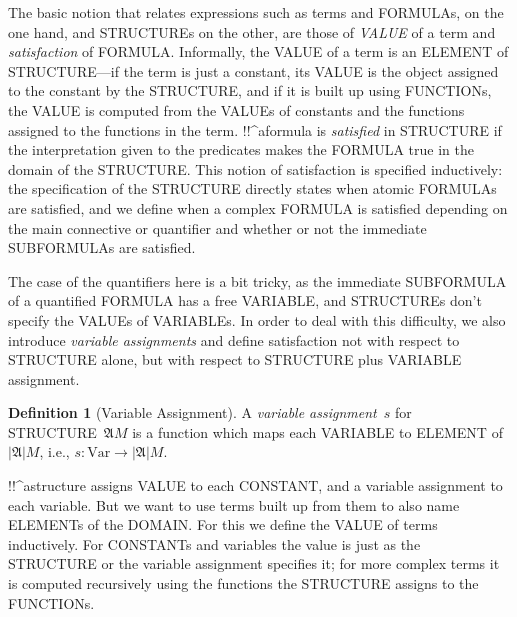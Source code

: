 \documentclass[10pt,a4paper]{article}
\newcommand*{\olup}[1]{\MakeUppercase{#1}}
\theoremstyle{plain}
\theoremstyle{definition}
\newtheorem{defn}[thm]{Definition}
\theoremstyle{remark}
\newenvironment{explain}{}{}
\providecommand{\Struct}{\ensuremath{\mathfrak{A}}}
\providecommand{\Domain}{\ensuremath{|\mathfrak{A}|}}
\providecommand{\Var}{\mathrm{Var}}
\begin{document}
\begin{explain}
The basic notion that relates expressions such as terms and
\olup{formula}s, on the one hand, and \olup{structure}s on the other, are
those of \emph{\olup{value}} of a term and \emph{satisfaction} of 
\olup{formula}.  Informally, the \olup{value} of a term is an \olup{element} of
\olup{structure}---if the term is just a constant, its \olup{value} is the
object assigned to the constant by the \olup{structure}, and if it is
built up using \olup{function}s, the \olup{value} is computed from the
\olup{value}s of constants and the functions assigned to the functions in
the term.  !!^a{formula} is \emph{satisfied} in \olup{structure} if the
interpretation given to the predicates makes the \olup{formula} true in
the domain of the \olup{structure}. This notion of satisfaction is
specified inductively: the specification of the \olup{structure} directly
states when atomic \olup{formula}s are satisfied, and we define when a
complex \olup{formula} is satisfied depending on the main connective or
quantifier and whether or not the immediate \olup{subformula}s are
satisfied. 

The case of the quantifiers here is a bit tricky, as the
immediate \olup{subformula} of a quantified \olup{formula} has a free
\olup{variable}, and \olup{structure}s don't specify the \olup{value}s of
\olup{variable}s.  In order to deal with this difficulty, we also
introduce \emph{variable assignments} and define satisfaction not with
respect to \olup{structure} alone, but with respect to \olup{structure}
plus \olup{variable} assignment.
\end{explain}

\begin{defn}[Variable Assignment]
A \emph{variable assignment}~$s$ for \olup{structure}~$\Struct{M}$ is a
function which maps each \olup{variable} to \olup{element} of~$\Domain M$,
i.e., $s\colon \Var \to \Domain M$.
\end{defn}

\begin{explain}
!!^a{structure} assigns \olup{value} to each \olup{constant}, and a
variable assignment to each variable.  But we want to use terms built
up from them to also name \olup{element}s of the \olup{domain}.  For this we
define the \olup{value} of terms inductively. For \olup{constant}s and
variables the value is just as the \olup{structure} or the variable
assignment specifies it; for more complex terms it is computed
recursively using the functions the \olup{structure} assigns to the
\olup{function}s.
\end{explain}
\end{document}
